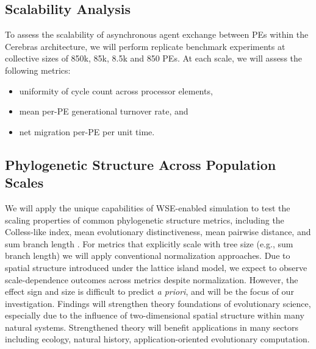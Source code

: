 \subsection{Scalability Analysis}

To assess the scalability of asynchronous agent exchange between PEs within the Cerebras architecture, we will perform replicate benchmark experiments at collective sizes of 850k, 85k, 8.5k and 850 PEs.
At each scale, we will assess the following metrics:
\begin{itemize}
\item uniformity of cycle count across processor elements,
\item mean per-PE generational turnover rate, and
\item net migration per-PE per unit time.
\end{itemize}

\subsection{Phylogenetic Structure Across Population Scales}

We will apply the unique capabilities of WSE-enabled simulation to test the scaling properties of common phylogenetic structure metrics, including the Colless-like index, mean evolutionary distinctiveness, mean pairwise distance, and sum branch length \citep{tucker2017guide}.
For metrics that explicitly scale with tree size (e.g., sum branch length) we will apply conventional normalization approaches.
Due to spatial structure introduced under the lattice island model, we expect to observe scale-dependence outcomes across metrics despite normalization.
However, the effect sign and size is difficult to predict \textit{a priori}, and will be the focus of our investigation.
Findings will strengthen theory foundations of evolutionary science, especially due to the influence of two-dimensional spatial structure within many natural systems.
Strengthened theory will benefit applications in many sectors including ecology, natural history, application-oriented evolutionary computation.

